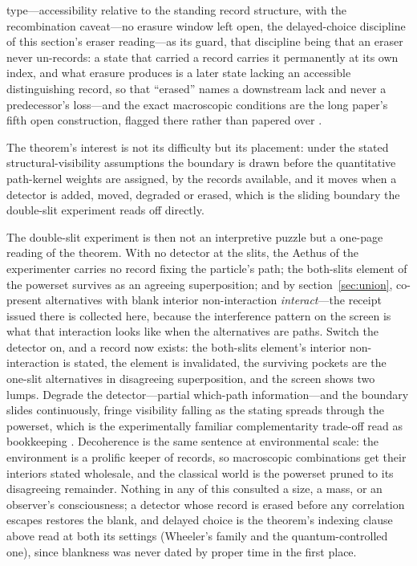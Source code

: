 \documentclass[11pt]{article}
\theoremstyle{definition}
\newcommand{\Aethus}{Aethus}
\begin{document}
type---accessibility relative to the standing record structure, with the recombination caveat---no erasure window left open, the delayed-choice discipline of this section's eraser reading---as its guard, that discipline being that an eraser never un-records: a state that carried a record carries it permanently at its own index, and what erasure produces is a later state lacking an accessible distinguishing record, so that ``erased'' names a downstream lack and never a predecessor's loss---and the exact macroscopic conditions are the long paper's fifth open construction, flagged there rather than papered over \cite{Aethus}.



The theorem's interest is not its difficulty but its placement: under the stated structural-visibility assumptions the boundary is drawn before the quantitative path-kernel weights are assigned, by the records available, and it moves when a detector is added, moved, degraded or erased, which is the sliding boundary the double-slit experiment reads off directly.



The double-slit experiment is then not an interpretive puzzle but a one-page reading of the theorem. With no detector at the slits, the \Aethus{} of the experimenter carries no record fixing the particle's path; the both-slits element of the powerset survives as an agreeing superposition; and by section~\ref{sec:union}, co-present alternatives with blank interior non-interaction \emph{interact}---the receipt issued there is collected here, because the interference pattern on the screen is what that interaction looks like when the alternatives are paths. Switch the detector on, and a record now exists: the both-slits element's interior non-interaction is stated, the element is invalidated, the surviving pockets are the one-slit alternatives in disagreeing superposition, and the screen shows two lumps. Degrade the detector---partial which-path information---and the boundary slides continuously, fringe visibility falling as the stating spreads through the powerset, which is the experimentally familiar complementarity trade-off read as bookkeeping \cite{scully1991quantum, durr1998origin}. Decoherence is the same sentence at environmental scale: the environment is a prolific keeper of records, so macroscopic combinations get their interiors stated wholesale, and the classical world is the powerset pruned to its disagreeing remainder. Nothing in any of this consulted a size, a mass, or an observer's consciousness; a detector whose record is erased before any correlation escapes restores the blank, and delayed choice is the theorem's indexing clause above read at both its settings (Wheeler's family \cite{wheeler1983law} and the quantum-controlled one), since blankness was never dated by proper time in the first place.
\end{document}
